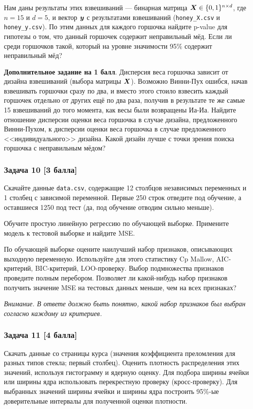\documentclass{article}
\renewenvironment{itemize}[1]{\begin{compactitem}#1}{\end{compactitem}}
\theoremstyle{plain}
\begin{document}
Нам даны результаты этих взвешиваний --- бинарная матрица $\boldsymbol{X} \in \{0, 1\}^{n \times d}$, где $n = 15$ и $d = 5$, и вектор $\boldsymbol{y}$ с результатами взвешиваний (\texttt{honey\_X.csv} и \texttt{honey\_y.csv}). По этим данных для каждого горшочка найдите p-value для гипотезы о том, что данный горшочек содержит неправильный мёд. Если ли среди горшочков такой, который на уровне значимости 95\% содержит неправильный мёд?

\textbf{Дополнительное задание на 1 балл}. Дисперсия веса горшочка зависит от дизайна взвешиваний (выбора матрицы $\boldsymbol{X}$). Возможно Винни-Пух ошибся, начав взвешивать горшочки сразу по два, и вместо этого стоило взвесить каждый горшочек отдельно от других ещё по два раза, получив в результате те же самые 15 взвешиваний до того момента, как весы были возвращены Иа-Иа. Найдите отношение дисперсии оценки веса горшочка в случае дизайна, предложенного Винни-Пухом, к дисперсии оценки веса горшочка в случае предложенного <<индивидуального>> дизайна. Какой дизайн лучше с точки зрения поиска горшочка с неправильным мёдом?

\subsubsection*{Задача 10 [3 балла]}
Скачайте данные \texttt{data.csv}, содержащие 12 столбцов независимых переменных и 1 столбец с зависимой переменной. Первые 250 строк отведите под обучение, а оставшиеся 1250 под тест (да, под обучение отводим сильно меньше).

\begin{itemize}
	\item Обучите простую линейную регрессию по обучающей выборке. Примените модель к тестовой выборке и найдите MSE.
	\item По обучающей выборке оцените наилучший набор признаков, описывающих выходную переменную. Используйте для этого статистику Cp Mallow, AIC-критерий, BIC-критерий, LOO-проверку. Выбор подмножества признаков проведите полным перебором. Позволяет ли какой-нибудь набор признаков получить значение MSE на тестовых данных меньше, чем на всех признаках?
	
	\textit{Внимание. В ответе должно быть понятно, какой набор признаков был выбран согласно каждому из критериев.}
\end{itemize}

\subsubsection*{Задача 11 [4 балла]}
Скачать данные со страницы курса (значения коэффициента преломления для разных типов стекла; первый столбец). Оценить плотность распределения этих значений, используя гистограмму и ядерную оценку. Для подбора ширины ячейки или ширины ядра использовать перекрестную проверку (кросс-проверку).  Для выбранных значений ширины ячейки и ширины ядра построить 95\%-ые доверительные интервалы для полученной оценки плотности.
\end{document}
